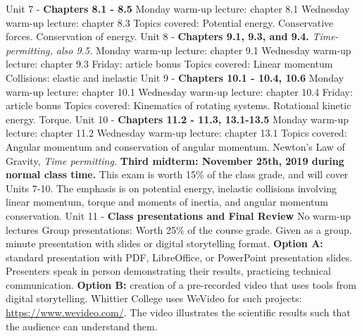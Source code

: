 \documentclass[10pt]{article}
\begin{document}
\begin{outline}[enumerate]
\1 Unit 7 - \textbf{Chapters 8.1 - 8.5}
\2 Monday warm-up lecture: chapter 8.1
\2 Wednesday warm-up lecture: chapter 8.3
\2 Topics covered:
\3 Potential energy.
\3 Conservative forces.
\3 Conservation of energy.
\1 Unit 8 - \textbf{Chapters 9.1, 9.3, and 9.4.} \textit{Time-permitting, also 9.5.}
\2 Monday warm-up lecture: chapter 9.1
\2 Wednesday warm-up lecture: chapter 9.3
\2 Friday: article bonus
\2 Topics covered:
\3 Linear momentum
\3 Collisions: elastic and inelastic
\1 Unit 9 - \textbf{Chapters 10.1 - 10.4, 10.6}
\2 Monday warm-up lecture: chapter 10.1
\2 Wednesday warm-up lecture: chapter 10.4
\2 Friday: article bonus
\2 Topics covered:
\3 Kinematics of rotating systems.
\3 Rotational kinetic energy.
\3 Torque.
\1 Unit 10 - \textbf{Chapters 11.2 - 11.3, 13.1-13.5}
\2 Monday warm-up lecture: chapter 11.2
\2 Wednesday warm-up lecture: chapter 13.1
\2 Topics covered:
\3 Angular momentum and conservation of angular momentum.
\3 Newton's Law of Gravity, \textit{Time permitting.}
\1 \textbf{Third midterm: November 25th, 2019 during normal class time.}  This exam is worth 15\% of the class grade, and will cover Units 7-10. The emphasis is on potential energy, inelastic collisions involving linear momentum, torque and moments of inertia, and angular momentum conservation.
\1 Unit 11 - \textbf{Class presentations and Final Review}
\2 No warm-up lectures
\2 Group presentations:
\3 Worth 25\% of the course grade.
\3 Given as a group.
 minute presentation with slides or digital storytelling format.
\3 \textbf{Option A:} standard presentation with PDF, LibreOffice, or PowerPoint presentation slides. Presenters speak in person demonstrating their results, practicing technical communication.
\3 \textbf{Option B:} creation of a pre-recorded video that uses tools from digital storytelling.  Whittier College uses WeVideo for such projects: \url{https://www.wevideo.com/}.  The video illustrates the scientific results such that the audience can understand them.
\end{outline}
\end{document}
